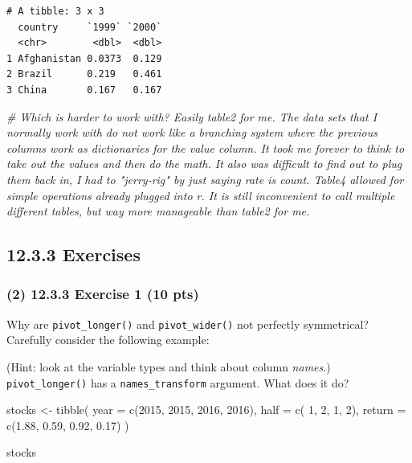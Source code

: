 \documentclass[
]{article}
\newenvironment{Shaded}{\begin{snugshade}}{\end{snugshade}}
\newcommand{\AttributeTok}[1]{\textcolor[rgb]{0.77,0.63,0.00}{#1}}
\newcommand{\CommentTok}[1]{\textcolor[rgb]{0.56,0.35,0.01}{\textit{#1}}}
\newcommand{\DecValTok}[1]{\textcolor[rgb]{0.00,0.00,0.81}{#1}}
\newcommand{\FloatTok}[1]{\textcolor[rgb]{0.00,0.00,0.81}{#1}}
\newcommand{\FunctionTok}[1]{\textcolor[rgb]{0.00,0.00,0.00}{#1}}
\newcommand{\NormalTok}[1]{#1}
\newcommand{\OtherTok}[1]{\textcolor[rgb]{0.56,0.35,0.01}{#1}}
\begin{document}
\begin{verbatim}
# A tibble: 3 x 3
  country     `1999` `2000`
  <chr>        <dbl>  <dbl>
1 Afghanistan 0.0373  0.129
2 Brazil      0.219   0.461
3 China       0.167   0.167
\end{verbatim}

\begin{Shaded}
\begin{Highlighting}[]
\CommentTok{\# Which is harder to work with? Easily table2 for me. The data sets that I normally work with do not work like a branching system where the previous columns work as dictionaries for the value column. It took me forever to think to take out the values and then do the math. It also was difficult to find out to plug them back in, I had to "jerry{-}rig" by just saying rate is count. Table4 allowed for simple operations already plugged into r. It is still inconvenient to call multiple different tables, but way more manageable than table2 for me.}
\end{Highlighting}
\end{Shaded}

\hypertarget{exercises-1}{%
\subsection{12.3.3 Exercises}\label{exercises-1}}

\hypertarget{exercise-1-10-pts}{%
\subsubsection{(2) 12.3.3 Exercise 1 (10 pts)}\label{exercise-1-10-pts}}

Why are \texttt{pivot\_longer()} and \texttt{pivot\_wider()} not
perfectly symmetrical? Carefully consider the following example:

(Hint: look at the variable types and think about column \emph{names}.)
\texttt{pivot\_longer()} has a \texttt{names\_transform} argument. What
does it do?

\begin{Shaded}
\begin{Highlighting}[]
\NormalTok{stocks }\OtherTok{\textless{}{-}} \FunctionTok{tibble}\NormalTok{(}
  \AttributeTok{year   =} \FunctionTok{c}\NormalTok{(}\DecValTok{2015}\NormalTok{, }\DecValTok{2015}\NormalTok{, }\DecValTok{2016}\NormalTok{, }\DecValTok{2016}\NormalTok{),}
  \AttributeTok{half  =} \FunctionTok{c}\NormalTok{(   }\DecValTok{1}\NormalTok{,    }\DecValTok{2}\NormalTok{,     }\DecValTok{1}\NormalTok{,    }\DecValTok{2}\NormalTok{),}
  \AttributeTok{return =} \FunctionTok{c}\NormalTok{(}\FloatTok{1.88}\NormalTok{, }\FloatTok{0.59}\NormalTok{, }\FloatTok{0.92}\NormalTok{, }\FloatTok{0.17}\NormalTok{)}
\NormalTok{)}

\NormalTok{stocks}
\end{Highlighting}
\end{Shaded}
\end{document}
